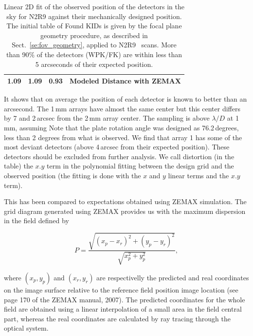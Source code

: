 \begin{table}[ht]
\begin{center}
\begin{tabular}{|c|c|c|l|}
1.09  & 1.09  & 0.93  & \small{Modeled Distance with ZEMAX}\\
\hline
\end{tabular}
\end{center}
\caption[Field-of-view deformations]{Linear 2D fit of the observed
  position of the detectors in the sky for N2R9 against their mechanically
  designed position. The initial table of Found KIDs is given
  by the focal plane geometry procedure, as described in
  Sect.~\ref{se:fov_geometry},
  applied to N2R9 \bm\ scans. More than 90\% of the detectors (WPK/FK) are
  within less than 5 arcseconds of their expected position. }
\end{table}

It shows that on average the position of each detector is known to better than
an arcsecond. The 1\,mm arrays have almost the same center but this center
differs by 7 and 2\,arcsec  from the 2\,mm array center. The sampling is above
$\lambda/D$ at 1\,mm, assuming  Note that
the plate rotation angle was designed as 76.2\,degrees, less than 2
degrees from what is observed. We find that array 1
has some of the most deviant detectors (above 4\,arcsec from their expected
position). These detectors should be excluded from further analysis. We call
distortion (in the table) the $x.y$ term in the polynomial fitting between the
design grid and the observed position (the fitting is done with the $x$ and
$y$ linear terms and the $x.y$ term). 

This has been compared to expectations obtained using ZEMAX
simulation. The grid diagram generated using ZEMAX provides us with
the maximum dispersion in the field defined by

\begin{equation}
P = \frac{\sqrt{(x_p - x_r)^2 + (y_p - y_r)^2}}{\sqrt{x_p^2 + y_p^2}},
\end{equation}

where $(x_p, y_p)$ and $(x_r, y_r)$ are respectivelly the predicted
and real coordinates on the image surface relative to the reference
field position image location (see page 170 of the ZEMAX manual, 2007).
The predicted coordinates for the whole field are obtained using a
linear interpolation of a small area in the field central part,
whereas the real coordinates are calculated by ray tracing through the
optical system.

